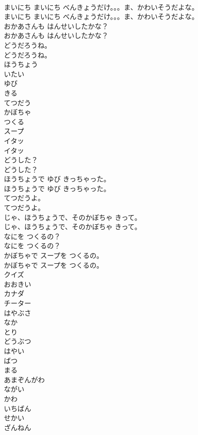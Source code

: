 \documentclass[8pt]{extreport}
\begin{document}
\begin{CJK}{UTF8}{min}
\\	まいにち まいにち べんきょうだけ。。。ま、かわいそうだよな。
\\	まいにち まいにち べんきょうだけ。。。ま、かわいそうだよな。
\\	おかあさんも はんせいしたかな？
\\	おかあさんも はんせいしたかな？
\\	どうだろうね。
\\	どうだろうね。
\\	ほうちょう
\\	いたい
\\	ゆび
\\	きる
\\	てつだう
\\	かぼちゃ
\\	つくる
\\	スープ
\\	イタッ
\\	イタッ
\\	どうした？
\\	どうした？
\\	ほうちょうで ゆび きっちゃった。
\\	ほうちょうで ゆび きっちゃった。
\\	てつだうよ。
\\	てつだうよ。
\\	じゃ、ほうちょうで、そのかぼちゃ きって。
\\	じゃ、ほうちょうで、そのかぼちゃ きって。
\\	なにを つくるの？
\\	なにを つくるの？
\\	かぼちゃで スープを つくるの。
\\	かぼちゃで スープを つくるの。
\\	クイズ
\\	おおきい
\\	カナダ
\\	チーター
\\	はやぶさ
\\	なか
\\	とり
\\	どうぶつ
\\	はやい
\\	ばつ
\\	まる
\\	あまぞんがわ
\\	ながい
\\	かわ
\\	いちばん
\\	せかい
\\	ざんねん

\end{CJK}
\end{document}
